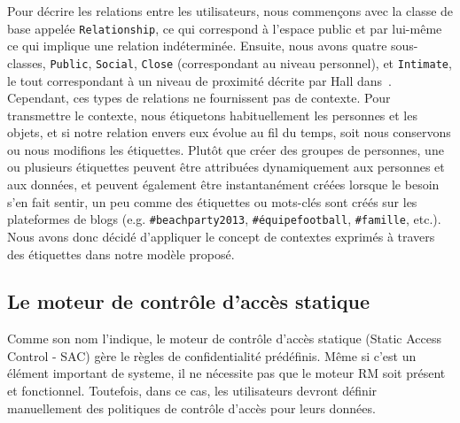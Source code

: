 \documentclass[a4paper]{article}
\begin{document}
Pour décrire les relations entre les utilisateurs, nous commençons avec la classe de base appelée \verb+Relationship+, ce qui correspond à l'espace public et par lui-même ce qui implique une relation indéterminée. Ensuite, nous avons quatre sous-classes, \verb+Public+, \verb+Social+, \verb+Close+ (correspondant au niveau personnel), et \verb+Intimate+, le tout correspondant à un niveau de proximité décrite par Hall dans~\cite{edward1966hall}. Cependant, ces types de relations ne fournissent pas de contexte. Pour transmettre le contexte, nous étiquetons habituellement les personnes et les objets, et si notre relation envers eux évolue au fil du temps, soit nous conservons ou nous modifions les étiquettes. Plutôt que créer des groupes de personnes, une ou plusieurs étiquettes peuvent être attribuées dynamiquement aux personnes et aux données, et peuvent également être instantanément créées lorsque le besoin s'en fait sentir, un peu comme des étiquettes ou mots-clés sont créés sur les plateformes de blogs (e.g. \verb+#beachparty2013+, \verb+#équipefootball+, \verb+#famille+, etc.). Nous avons donc décidé d'appliquer le concept de contextes exprimés à travers des étiquettes dans notre modèle proposé.

\subsection{Le moteur de contrôle d'accès statique}
\label{sec:acs}
Comme son nom l'indique, le moteur de contrôle d'accès statique (Static Access Control - SAC) gère le règles de confidentialité prédéfinis. Même si c'est un élément important de systeme, il ne nécessite pas que le moteur RM soit présent et fonctionnel. Toutefois, dans ce cas, les utilisateurs devront définir manuellement des politiques de contrôle d'accès pour leurs données.\\
\end{document}
